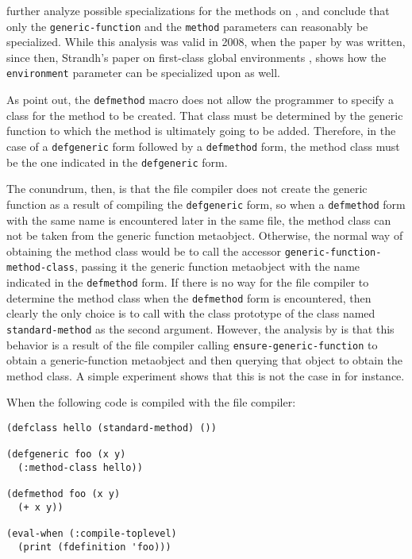 \cnh{} further analyze possible specializations for the methods on
\mml{}, and conclude that only the \texttt{generic-function} and the
\texttt{method} parameters can reasonably be specialized.  While this
analysis was valid in 2008, when the paper by \cnh{} was written,
since then, Strandh's paper on first-class global environments
\cite{Strandh:2015:ELS:Environments}, shows how the
\texttt{environment} parameter can be specialized upon as well.

As \cnh{} point out, the \texttt{defmethod} macro does
not allow the programmer to specify a class for the method to be
created.  That class must be determined by the generic function to
which the method is ultimately going to be added.  Therefore, in the
case of a \texttt{defgeneric} form followed by a \texttt{defmethod}
form, the method class must be the one indicated in the
\texttt{defgeneric} form.

The conundrum, then, is that the file compiler does not create the
generic function as a result of compiling the \texttt{defgeneric}
form, so when a \texttt{defmethod} form with the same name is
encountered later in the same file, the method class can not be taken
from the generic function metaobject.  Otherwise, the normal way of
obtaining the method class would be to call the accessor
\texttt{generic-function-method-class}, passing it the generic
function metaobject with the name indicated in the \texttt{defmethod}
form.  If there is no way for the file compiler to determine the
method class when the \texttt{defmethod} form is encountered, then
clearly the only choice is to call \mml{} with the class prototype of
the class named \texttt{standard-method} as the second argument.
However, the analysis by \cnh{} is that this behavior is a result of
the file compiler calling \texttt{ensure-generic-function} to obtain a
generic-function metaobject and then querying that object to obtain
the method class.  A simple experiment shows that this is not the case
in \sbcl{} for instance.

When the following code is compiled with the \sbcl{} file compiler:

\begin{verbatim}
(defclass hello (standard-method) ())

(defgeneric foo (x y)
  (:method-class hello))

(defmethod foo (x y)
  (+ x y))

(eval-when (:compile-toplevel)
  (print (fdefinition 'foo)))
\end{verbatim}

